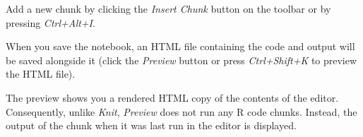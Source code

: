 \documentclass[
  hyperref,]{ctexart}
\begin{document}
Add a new chunk by clicking the \emph{Insert Chunk} button on the
toolbar or by pressing \emph{Ctrl+Alt+I}.

When you save the notebook, an HTML file containing the code and output
will be saved alongside it (click the \emph{Preview} button or press
\emph{Ctrl+Shift+K} to preview the HTML file).

The preview shows you a rendered HTML copy of the contents of the
editor. Consequently, unlike \emph{Knit}, \emph{Preview} does not run
any R code chunks. Instead, the output of the chunk when it was last run
in the editor is displayed.
\end{document}
